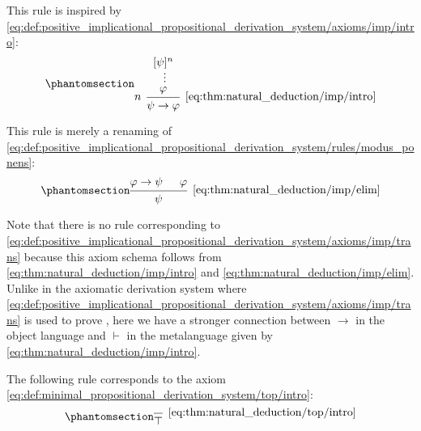 \begin{proposition}
\begin{thmenum}
    \begin{minipage}[t]{0.45\textwidth}
      This rule is inspired by \eqref{eq:def:positive_implicational_propositional_derivation_system/axioms/imp/intro}:
      \begin{equation*}\taglabel[\textrm{R} \( \rightarrow^+ \)]{eq:thm:natural_deduction/imp/intro}
        \begin{prooftree}
          \hypo{ [\psi]^n }
          \ellipsis {} { \varphi }
          \infer[left label=\( n \)]1[\ref{eq:thm:natural_deduction/imp/intro}]{ \psi \rightarrow \varphi }
        \end{prooftree}
      \end{equation*}
    \end{minipage}
    \hfill
    \begin{minipage}[t]{0.45\textwidth}
      This rule is merely a renaming of \eqref{eq:def:positive_implicational_propositional_derivation_system/rules/modus_ponens}:
      \begin{equation*}\taglabel[\textrm{R} \( \rightarrow^- \)]{eq:thm:natural_deduction/imp/elim}
        \begin{prooftree}
          \hypo{ \varphi \rightarrow \psi }
          \hypo{ \varphi }
          \infer2[\ref{eq:thm:natural_deduction/imp/elim}]{ \psi }
        \end{prooftree}
      \end{equation*}
    \end{minipage}

    Note that there is no rule corresponding to \eqref{eq:def:positive_implicational_propositional_derivation_system/axioms/imp/trans} because this axiom schema follows from \eqref{eq:thm:natural_deduction/imp/intro} and \eqref{eq:thm:natural_deduction/imp/elim}. Unlike in the axiomatic derivation system where \eqref{eq:def:positive_implicational_propositional_derivation_system/axioms/imp/trans} is used to prove , here we have a stronger connection between \( \rightarrow \) in the object language and \( \vdash \) in the metalanguage given by \eqref{eq:thm:natural_deduction/imp/intro}.

     The following rule corresponds to the axiom \eqref{eq:def:minimal_propositional_derivation_system/top/intro}:
    \begin{equation*}\taglabel[\textrm{R} \( \top^+ \)]{eq:thm:natural_deduction/top/intro}
      \begin{prooftree}
        \infer0[\ref{eq:thm:natural_deduction/top/intro}]{ \top }
      \end{prooftree}
    \end{equation*}


\end{thmenum}
\end{proposition}
